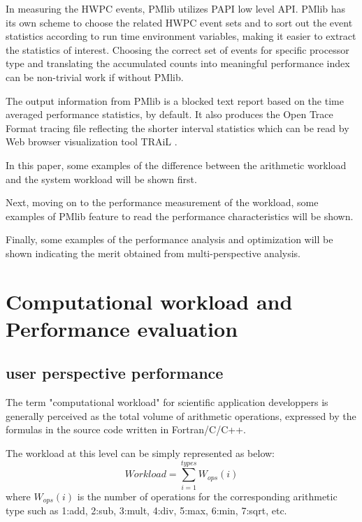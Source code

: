 \documentclass[conference]{IEEEtran}
\begin{document}
In measuring the HWPC events, PMlib utilizes PAPI \cite{} low level API.
PMlib has its own scheme to choose the related HWPC event sets and to sort out
the event statistics according to run time environment variables, making it
easier to extract the statistics of interest.
Choosing the correct set of events for specific processor type and
translating the accumulated counts into meaningful performance index can be
non-trivial work if without PMlib.

The output information from PMlib is a blocked text report based on
the time averaged performance statistics, by default.
It also produces the Open Trace Format \cite{} tracing file reflecting
the shorter interval statistics which can be read by Web browser
visualization tool TRAiL \cite{}.

In this paper, some examples of the difference between
the arithmetic workload and the system workload will be shown first.

Next, moving on to the performance measurement of the workload,
some examples of PMlib feature to read the performance characteristics
will be shown.

Finally, some examples of the performance analysis and optimization
will be shown indicating the merit obtained from 
multi-perspective analysis.


\section{Computational workload and Performance evaluation}
\subsection{user perspective performance}

The term "computational workload" for scientific application developpers
is generally perceived as the total volume of arithmetic operations,
expressed by the formulas in the source code written in Fortran/C/C++.

The workload at this level can be simply represented as below:
\begin{equation}\label{arithmetic-workload}
	Workload = \sum_{i=1}^{types} W_{ops}(i)
\end{equation}
where $ W_{ops}(i) $ is the number of operations for the
corresponding arithmetic type such as
1:add, 2:sub, 3:mult, 4:div, 5:max, 6:min, 7:sqrt, etc.
\end{document}
